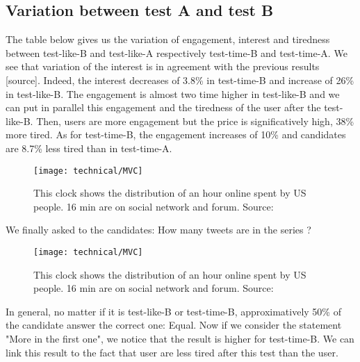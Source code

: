\subsection{Variation between test A and test B}
The table below gives us the variation of engagement, interest and tiredness between test-like-B and test-like-A respectively test-time-B and test-time-A. We see that variation of the interest is in agreement with the previous results [source]. Indeed, the interest decreases of 3.8\% in test-time-B and increase of 26\% in test-like-B. The engagement is almost two time higher in test-like-B and we can put in parallel this engagement and the tiredness of the user after the test-like-B. Then, users are more engagement but the price is significatively high, 38\% more tired. As for test-time-B, the engagement increases of 10\% and candidates are 8.7\% less tired than in test-time-A.

\begin{figure}[h] 
\centering 
\texttt{[image: technical/MVC]} 
\caption[Time spent of Social Media]{This clock shows the distribution of an hour online spent by US people. 16 min are on social network and forum. Source: \cite{s_clock}}
\label{fig:tinder} 
\end{figure}

We finally asked to the candidates: How many tweets are in the series ?\\ 

\begin{figure}[h] 
\centering 
\texttt{[image: technical/MVC]} 
\caption[Time spent of Social Media]{This clock shows the distribution of an hour online spent by US people. 16 min are on social network and forum. Source: \cite{s_clock}}
\label{fig:tinder} 
\end{figure}

In general, no matter if it is test-like-B or test-time-B, approximatively 50\% of the candidate answer the correct one: Equal. Now if we consider the statement "More in the first one", we notice that the result is higher for test-time-B. We can link this result to the fact that user are less tired after this test than the user.




